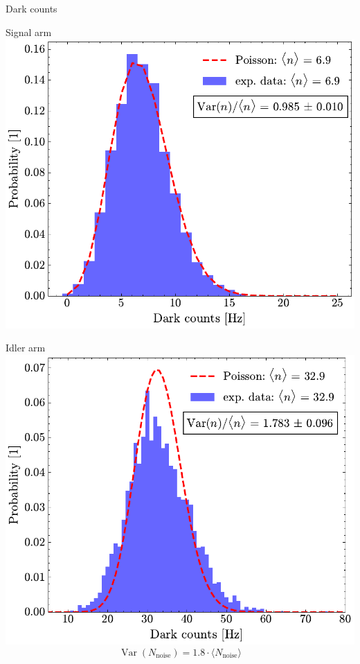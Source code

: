 \documentclass[10pt,aspectratio=43]{beamer}
\begin{document}
	\begin{frame}{Dark counts}
		\begin{minipage}{.45\textwidth}
			\centering
			Signal arm
			\vspace{2em}
			\includegraphics[width=\textwidth]{Images/DC_Sig_2.pdf}
		\end{minipage}
		\hfill
		\begin{minipage}{.45\textwidth}
			\centering
			Idler arm
			{\vspace*{4em}}
			\includegraphics[width=\textwidth]{Images/DC_Idl_2.pdf}
			\vspace*{-4em}
			\begin{equation*}
				\operatorname{Var}\!\left(N_{\text{noise}}\right) = 1.8 \cdot \langle N_{\text{noise}} \rangle
			\end{equation*}
		\end{minipage}
	\end{frame}
	
\end{document}
